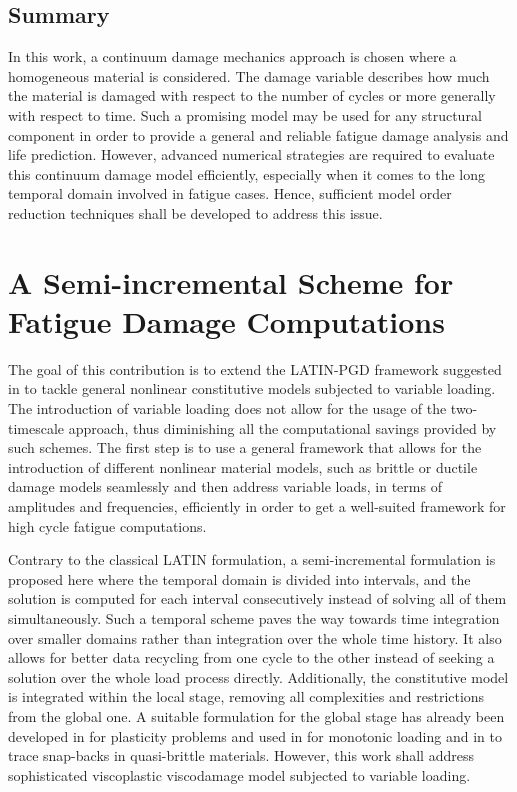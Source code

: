 \section{Summary}
In this work, a continuum damage mechanics approach is chosen where a homogeneous material is considered. The damage variable describes how much the material is damaged with respect to the number of cycles or more generally with respect to time. Such a promising model may be used for any structural component in order to provide a general and reliable fatigue damage analysis and life prediction. However, advanced numerical strategies are required to evaluate this continuum damage model efficiently, especially when it comes to the long temporal domain involved in fatigue cases. Hence, sufficient model order reduction techniques shall be developed to address this issue.


\chapter{A Semi-incremental Scheme for Fatigue Damage Computations}
\label{semi_incremental}

The goal of this contribution is to extend the LATIN-PGD framework suggested in \parencite{bhattacharyya2018model} to tackle general nonlinear constitutive models subjected to variable loading. The introduction of variable loading does not allow for the usage of the two-timescale approach, thus diminishing all the computational savings provided by such schemes. The first step is to use a general framework that allows for the introduction of different nonlinear material models, such as brittle or ductile damage models seamlessly and then address variable loads, in terms of amplitudes and frequencies, efficiently in order to get a well-suited framework for high cycle fatigue computations.

Contrary to the classical LATIN formulation, a semi-incremental formulation is proposed here where the temporal domain is divided into intervals, and the solution is computed for each interval consecutively instead of solving all of them simultaneously. Such a temporal scheme paves the way towards time integration over smaller domains rather than integration over the whole time history. It also allows for better data recycling from one cycle to the other instead of seeking a solution over the whole load process directly. Additionally, the constitutive model is integrated within the local stage, removing all complexities and restrictions from the global one. A suitable formulation for the global stage has already been developed in \parencite{Boisse1990,Boisse1991} for plasticity problems and used in \parencite{allix1989damage} for monotonic loading and in \parencite{vandoren2013novel} to trace snap-backs in quasi-brittle materials. However, this work shall address sophisticated viscoplastic viscodamage model subjected to variable loading.

